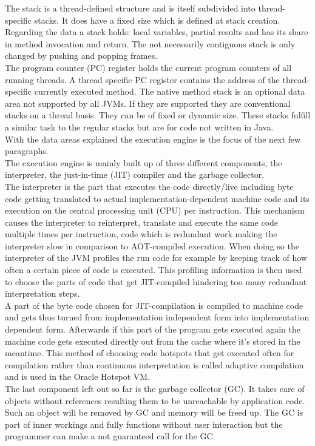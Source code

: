 The stack is a thread-defined structure and is itself subdivided into thread-specific stacks. It does have a fixed size which is defined at stack creation. Regarding the data a stack holds: local variables, partial results and has its share in method invocation and return. The not necessarily contiguous stack is only changed by pushing and popping frames.\\
The program counter (PC) register holds the current program counters of all running threads. A thread specific PC register contains the address of the thread-specific currently executed method.
The native method stack is an optional data area not supported by all JVMs. If they are supported they are conventional stacks on a thread basis. They can be of fixed or dynamic size. These stacks fulfill a similar task to the regular stacks but are for code not written in Java.\\
With the data areas explained the execution engine is the focus of the next few paragraphs.\\
The execution engine is mainly built up of three different components, the interpreter, the just-in-time (JIT) compiler and the garbage collector.\\
The interpreter is the part that executes the code directly/live including byte code getting translated to actual implementation-dependent machine code and its execution on the central processing unit (CPU) per instruction. This mechanism causes the interpreter to reinterpret, translate and execute the same code multiple times per instruction, code which is redundant work making the interpreter slow in comparison to AOT-compiled execution. When doing so the interpreter of the JVM profiles the run code for example by keeping track of how often a certain piece of code is executed. This profiling information is then used to choose the parts of code that get JIT-compiled hindering too many redundant interpretation steps.\\
A part of the byte code chosen for JIT-compilation is compiled to machine code and gets thus turned from implementation independent form into implementation dependent form. Afterwards if this part of the program gets executed again the machine code gets executed directly out from the cache where it's stored in the meantime. This method of choosing code hotspots that get executed often for compilation rather than continuous interpretation is called adaptive compilation and is used in the Oracle Hotspot VM.\\
The last component left out so far is the garbage collector (GC). It takes care of objects without references resulting them to be unreachable by application code. Such an object will be removed by GC and memory will be freed up. The GC is part of inner workings and fully functions without user interaction but the programmer can make a not guaranteed call for the GC.\cite{Lindholm}\\
